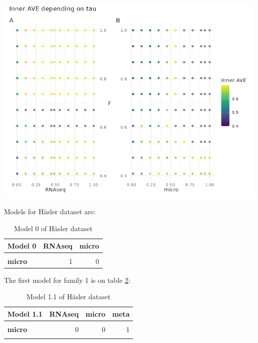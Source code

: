 \documentclass[
  a4paper,
]{book}
\let\origfigure\figure
\let\endorigfigure\endfigure
\renewenvironment{figure}[1][2] {
    \expandafter\origfigure\expandafter[!ht]
} {
    \endorigfigure
}
\begin{document}
\begin{figure}
\centering
\includegraphics{images/hasler-centroid_tau.png}
\caption{\label{fig:hasler-tau} Changes on tau on the centroid scheme on the Häsler dataset affect the inner AVE score on the model 1. The panel A shows on the ordinate the RNAseq tau value, the panel B on the right, shows the tau of the microorganism; both of them show the y's tau on the abscissa.}
\end{figure}

Models for Häsler dataset are:

\begin{table}[H]

\caption[Model 0 of Häsler dataset]{\label{tab:hasler-model-0}Model 0 of Häsler dataset}
\centering
\begin{tabular}[t]{|>{}l|r|>{}r|}
\hline
\textbf{Model 0} & \textbf{RNAseq} & \textbf{micro}\\
\hline
\textbf{\cellcolor{gray!6}{RNAseq}} & \cellcolor{gray!6}{0} & \cellcolor{gray!6}{1}\\
\hline
\textbf{micro} & 1 & 0\\
\hline
\end{tabular}
\end{table}

The first model for family 1 is on table \ref{tab:hasler-model-1-1}:

\begin{table}[H]

\caption[Model 1.1 of Häsler dataset]{\label{tab:hasler-model-1-1}Model 1.1 of Häsler dataset}
\centering
\begin{tabular}[t]{|>{}l|r|r|>{}r|}
\hline
\textbf{Model 1.1} & \textbf{RNAseq} & \textbf{micro} & \textbf{meta}\\
\hline
\textbf{\cellcolor{gray!6}{RNAseq}} & \cellcolor{gray!6}{0} & \cellcolor{gray!6}{0} & \cellcolor{gray!6}{1}\\
\hline
\textbf{micro} & 0 & 0 & 1\\
\hline
\textbf{\cellcolor{gray!6}{meta}} & \cellcolor{gray!6}{1} & \cellcolor{gray!6}{1} & \cellcolor{gray!6}{0}\\
\hline
\end{tabular}
\end{table}
\end{document}

